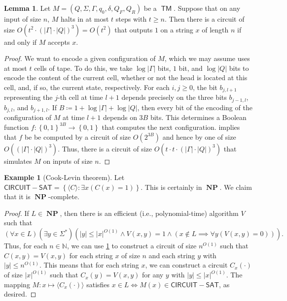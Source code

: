 \documentclass[10pt,letterpaper,cm]{nupset}
\theoremstyle{definition}
\newtheorem{exmp}[definition]{Example}
\theoremstyle{theorem}
\newtheorem{lemma}[definition]{Lemma}
\theoremstyle{remark}
\newcommand{\N}{\mathbb N}
\newcommand{\1}{\mathbf{1}}
\newcommand{\0}{\vec 0}
\DeclareMathOperator{\TM}{\mathsf{TM}}
\DeclareMathOperator{\NP}{\mathbf{NP}}
\begin{document}
\begin{lemma}\label{pl2}
Let $M= \left(Q, \Sigma, \Gamma, q_0, \delta, Q_F, Q_R\right)$ be a $\TM$. Suppose that on any input of size $n$, $M$ halts in at most $t$ steps with $t\geq n$. Then there is a circuit of size $O(t^2 \cdot (\left\lvert{\Gamma}\right\rvert\cdot \left\lvert{Q}\right\rvert)^3) = O(t^2)$ that  outputs $1$ on a  string $x$ of length $n$ if and only if $M$ accepts $x$.
\end{lemma}
\begin{proof}
We want to encode a given configuration of $M$, which we may assume uses at most $t$ cells of tape. To do this, we take $\log{\left\lvert{\Gamma}\right\rvert}$ bits, $1$ bit, and $\log{\left\lvert{Q}\right\rvert}$ bits to encode the content of the current cell, whether or not the head is located at this cell, and, if so, the current state, respectively.  For each $i,j\geq0$, the bit $b_{j, l+1}$ representing the $j$-th cell at time $l+1$ depends precisely on the three bits $b_{j-1, l}$, $b_{j, l}$, and $b_{j+1, l}$. If $B\coloneqq 1+ \log{\left\lvert{\Gamma}\right\rvert} +\log{\left\lvert{Q}\right\rvert}$, then every bit of the encoding of the configuration of $M$ at time $l+1$ depends on $3B$ bits. This determines a Boolean function $f: \left\{0,1\right\}^{3B}\to \left\{0,1\right\}$ that computes the next configuration.  implies that $f$ be be computed by a circuit of size $O(2^{3B})$ and hence by one of size $O(\left(\left\lvert{\Gamma}\right\rvert\cdot \left\lvert{Q}\right\rvert\right)^3)$. Thus, there is a circuit of size $O(t\cdot t\cdot  \left(\left\lvert{\Gamma}\right\rvert \cdot \left\lvert{Q}\right\rvert\right)^3 )$ that simulates $M$ on inputs of size $n$.
\end{proof}

\begin{exmp}[Cook-Levin theorem]
Let  $\mathsf{CIRCUIT{-}SAT} = \left\{ \langle C \rangle : \exists x\left(C(x) = 1\right)\right\}$. This is certainly in $\NP$. We claim that it is $\NP$-complete.
\end{exmp}
\begin{proof}
If $L \in \NP$, then there is an efficient (i.e.,  polynomial-time) algorithm $V$ such that $$\left(\forall x\in L\right)\left(\exists y\in \Sigma^{\ast}\right)\left(\left\lvert{y}\right\rvert\leq \left\lvert{x}\right\rvert^{O(1)} \land V\left(x,y\right) =1 \land \left(x\notin L \implies \forall y\left(V\left(x,y\right)=0\right)\right)\right).$$ Thus, for each $n\in \N$, we can use \cref{pl2} to construct a circuit of size $n^{O(1)}$ such that $C\left(x,y\right) = V\left(x,y\right)$ for each string $x$ of size $n$ and each string $y$ with $\left\lvert{y}\right\rvert\leq n^{O(1)}$. This means that for each string $x$, we can construct a circuit $C_x({\cdot})$ of size $\left\lvert{x}\right\rvert^{O(1)}$ such that $C_x(y) = V\left(x,y\right)$ for any $y$ with $\left\lvert{y}\right\rvert\leq \left\lvert{x}\right\rvert^{O(1)}$. The mapping $M: x\mapsto \langle C_x({\cdot}) \rangle$ satisfies $x\in L \iff M(x) \in \mathsf{CIRCUIT{-}SAT}$, as desired.  
\end{proof}
\end{document}
